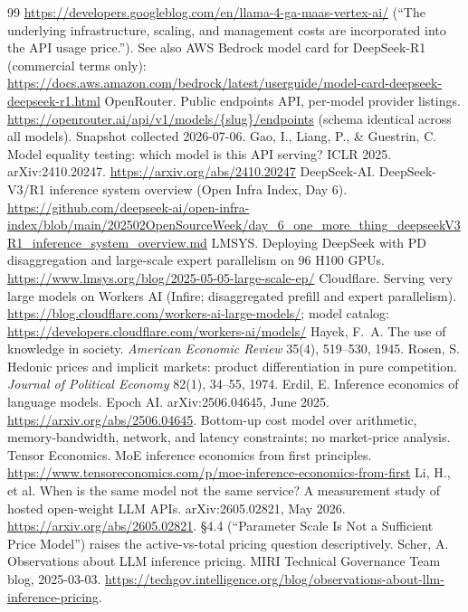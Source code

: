 \documentclass[11pt]{article}
\begin{document}
\begin{thebibliography}{99}
\url{https://developers.googleblog.com/en/llama-4-ga-maas-vertex-ai/} (``The
underlying infrastructure, scaling, and management costs are incorporated into
the API usage price.''). See also AWS Bedrock model card for DeepSeek-R1
(commercial terms only):
\url{https://docs.aws.amazon.com/bedrock/latest/userguide/model-card-deepseek-deepseek-r1.html}
 OpenRouter. Public endpoints API, per-model provider listings.
\url{https://openrouter.ai/api/v1/models/{slug}/endpoints}
(schema identical across all models). Snapshot collected 2026-07-06.
 Gao, I., Liang, P., \& Guestrin, C. Model equality testing:
which model is this API serving? ICLR 2025. arXiv:2410.20247.
\url{https://arxiv.org/abs/2410.20247}
 DeepSeek-AI. DeepSeek-V3/R1 inference system overview (Open
Infra Index, Day 6).
\url{https://github.com/deepseek-ai/open-infra-index/blob/main/202502OpenSourceWeek/day_6_one_more_thing_deepseekV3R1_inference_system_overview.md}
 LMSYS. Deploying DeepSeek with PD disaggregation and large-scale
expert parallelism on 96 H100 GPUs.
\url{https://www.lmsys.org/blog/2025-05-05-large-scale-ep/}
 Cloudflare. Serving very large models on Workers AI (Infire;
disaggregated prefill and expert parallelism).
\url{https://blog.cloudflare.com/workers-ai-large-models/}; model catalog:
\url{https://developers.cloudflare.com/workers-ai/models/}
 Hayek, F.~A. The use of knowledge in society. \emph{American
Economic Review} 35(4), 519--530, 1945.
 Rosen, S. Hedonic prices and implicit markets: product
differentiation in pure competition. \emph{Journal of Political Economy}
82(1), 34--55, 1974.
 Erdil, E. Inference economics of language models. Epoch AI.
arXiv:2506.04645, June 2025. \url{https://arxiv.org/abs/2506.04645}. Bottom-up
cost model over arithmetic, memory-bandwidth, network, and latency
constraints; no market-price analysis.
 Tensor Economics. MoE inference economics from first principles.
\url{https://www.tensoreconomics.com/p/moe-inference-economics-from-first}
 Li, H., et al. When is the same model not the same service? A
measurement study of hosted open-weight LLM APIs. arXiv:2605.02821, May 2026.
\url{https://arxiv.org/abs/2605.02821}. \S4.4 (``Parameter Scale Is Not a
Sufficient Price Model'') raises the active-vs-total pricing question
descriptively.
 Scher, A. Observations about LLM inference pricing. MIRI
Technical Governance Team blog, 2025-03-03.
\url{https://techgov.intelligence.org/blog/observations-about-llm-inference-pricing}.

\end{thebibliography}
\end{document}
